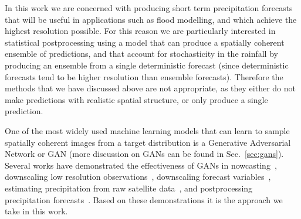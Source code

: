 \documentclass[../main.tex]{subfiles}
\begin{document}


In this work we are concerned with producing short term precipitation forecasts that will be useful in applications such as flood modelling, and which achieve the highest resolution possible. For this reason we are particularly interested in statistical postprocessing using a model that can produce a spatially coherent ensemble of predictions, and that account for stochasticity in the rainfall by producing an ensemble from a single deterministic forecast (since deterministic forecasts tend to be higher resolution than ensemble forecasts). Therefore the methods that we have discussed above are not appropriate, as they either do not make predictions with realistic spatial structure, or only produce a single prediction. 

One of the most widely used machine learning models that can learn to sample spatially coherent images from a target distribution is a Generative Adversarial Network or GAN (more discussion on GANs can be found in Sec.~\ref{sec:gans}). Several works have demonstrated the effectiveness of GANs in nowcasting~\citep{ravuri_skilful_2021}, downscaling low resolution observations~\citep{leinonen_stochastic_2020}, downscaling forecast variables~\citep{harris_generative_2022, price_increasing_2022}, estimating precipitation from raw satellite data~\citep{hayatbini_conditional_2019}, and postprocessing precipitation forecasts~\citep{duncan_generative_2022, jeong_correcting_2023,  hess_physically_2022, yang_improving_2023}. Based on these demonstrations it is the approach we take in this work. 
\end{document}
